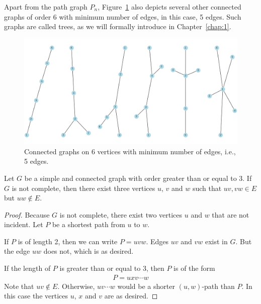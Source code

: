 \documentclass[thmcnt=section, 12pt, color=cyan]{my-elegantbook}
\begin{document}
Apart from the path graph $P_n$, 
Figure~\ref{fig:6} also depicts several other 
connected graphs of order 6 
with minimum number of edges, 
in this case, 5 edges.
Such graphs are called trees, 
as we will formally introduce in Chapter~\ref{chap:1}.

\begin{figure}[ht]
	\centering
	\includegraphics[scale=0.5]{figures/g-006.png}
	\caption{
		Connected graphs on 6 vertices 
		with minimum number of edges, 
		i.e., 5 edges.
	}	
	\label{fig:6}
\end{figure}



\begin{proposition} \label{pro:7}
	Let $G$ be a simple and connected graph
	with order greater than or equal to 3.
	If $G$ is not complete,
	then there exist three vertices $u$, $v$ and $w$ such that 
	$uv, vw \in E$ but $uw \notin E$.
\end{proposition}

\begin{proof}
	Because $G$ is not complete, 
	there exist two vertices $u$ and $w$ that are not incident.
	Let $P$ be a shortest path from $u$ to $w$.
	
	If $P$ is of length 2, then we can write 
	$P = u v w$.
	Edges $uv$ and $vw$ exist in $G$. 
	But the edge $uw$ does not, which is as desired.

	If the length of $P$ is greater than or equal to $3$, 
	then $P$ is of the form 
	\begin{align*}
		P = u x v \cdots w 
	\end{align*}
	Note that $uv \notin E$. 
	Otherwise, $u v \cdots w$ would be 
	a shorter $(u,w)$-path than $P$.
	In this case the vertices $u$, $x$ and $v$ are as desired.
\end{proof}

\end{document}
